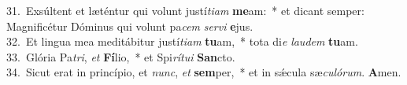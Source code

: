 {31.~}Exsúltent et læténtur qui volunt justí\textit{ti}\textit{am} \textbf{me}am:~* et dicant semper: Magnificétur Dóminus qui volunt pa\textit{cem} \textit{ser}\textit{vi} \textbf{e}jus.\\
{32.~}Et lingua mea meditábitur justí\textit{ti}\textit{am} \textbf{tu}am,~* tota di\textit{e} \textit{lau}\textit{dem} \textbf{tu}am.\\
{33.~}Glória Pa\textit{tri}, \textit{et} \textbf{Fí}lio,~* et Spi\textit{rí}\textit{tu}\textit{i} \textbf{San}cto.\\
{34.~}Sicut erat in princípio, et \textit{nunc}, \textit{et} \textbf{sem}per,~* et in sǽcula sæ\textit{cu}\textit{ló}\textit{rum}. \textbf{A}men.\\
